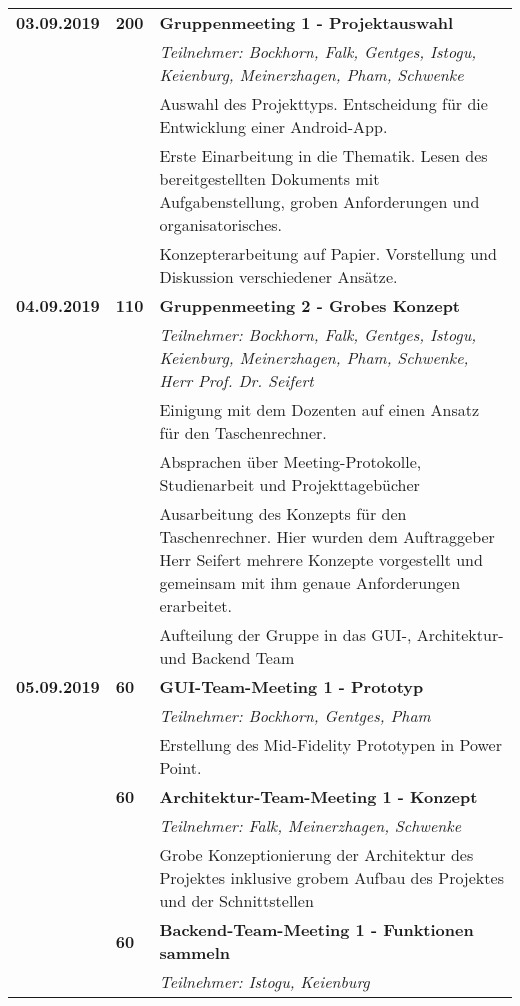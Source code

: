 {\begin{longtable}{|l|l|p{11cm}|}
		\textbf{03.09.2019} 
			& \hfill\textbf{200} & \textbf{Gruppenmeeting 1 - Projektauswahl}
			\\ & &
			\small{\textit{Teilnehmer: Bockhorn, Falk, Gentges, Istogu, Keienburg, Meinerzhagen, Pham, Schwenke}}
			\\ & &
			Auswahl des Projekttyps. Entscheidung für die Entwicklung einer Android-App.
			\\ & &
			Erste Einarbeitung in die Thematik. Lesen des bereitgestellten Dokuments mit Aufgabenstellung, groben Anforderungen und organisatorisches. 
			\\ & &
			Konzepterarbeitung auf Papier. Vorstellung und Diskussion verschiedener Ansätze.
	\\\hline
		\textbf{04.09.2019} 
			& \textbf{\hfill110} & \textbf{Gruppenmeeting 2 - Grobes Konzept}
			\\ & &
			\small{\textit{Teilnehmer: Bockhorn, Falk, Gentges, Istogu, Keienburg, Meinerzhagen, Pham, Schwenke, Herr Prof. Dr. Seifert}}
			\\ & &
			Einigung mit dem Dozenten auf einen Ansatz für den Taschenrechner.
			\\ & &
			Absprachen über Meeting-Protokolle, Studienarbeit und Projekttagebücher
			\\ & &
			Ausarbeitung des Konzepts für den Taschenrechner. Hier wurden dem Auftraggeber Herr Seifert mehrere Konzepte vorgestellt und gemeinsam mit ihm genaue Anforderungen erarbeitet.
			\\ & &
			Aufteilung der Gruppe in das GUI-, Architektur- und Backend Team
	\\\hline
		\textbf{05.09.2019} 
			& \textbf{\hfill60} & \textbf{GUI-Team-Meeting 1 - Prototyp} 
			\\ & &
			\small{\textit{Teilnehmer: Bockhorn, Gentges, Pham}}
			\\ & &
			Erstellung des Mid-Fidelity Prototypen in Power Point.			
		\\ \cline{2-3}
		& \textbf{\hfill60} & \textbf{Architektur-Team-Meeting 1 - Konzept} 
			\\ & &
			\small{\textit{Teilnehmer: Falk, Meinerzhagen, Schwenke}}
			\\ & &
			Grobe Konzeptionierung der Architektur des Projektes inklusive grobem Aufbau des Projektes und der Schnittstellen  
		\\ \cline{2-3}
		& \textbf{\hfill60} & \textbf{Backend-Team-Meeting 1 - Funktionen sammeln} 
			\\ & &
			\small{\textit{Teilnehmer: Istogu, Keienburg}}

\end{longtable}}

